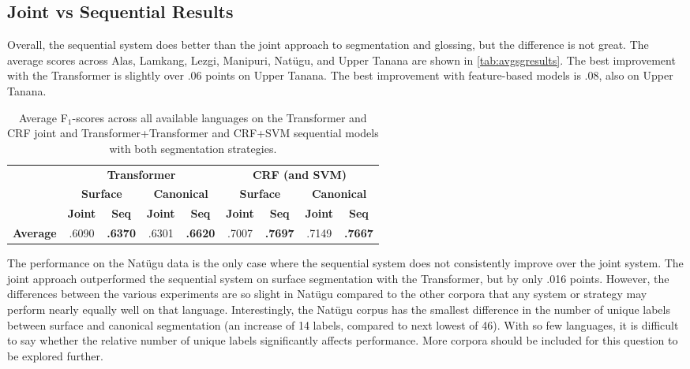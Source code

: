 \subsection{Joint vs Sequential Results}

Overall, the sequential system does better than the joint approach to segmentation and glossing, but the difference is not great. The average scores across Alas, Lamkang, Lezgi, Manipuri, Nat\"ugu, and Upper Tanana are shown in \autoref{tab:avgsgresults}. The best improvement with the Transformer is slightly over .06 points on Upper Tanana. The best improvement with feature-based models is .08, also on Upper Tanana. 

\begin{table}[!tb]
    \centering
    \begin{tabular}{l|cc|cc|cc|cc}
          & \multicolumn{4}{c|}{\textbf{Transformer}} & \multicolumn{4}{c}{\textbf{CRF (and SVM)}} 
          \\
          & \multicolumn{2}{c|}{\textbf{Surface}} & \multicolumn{2}{c|}{\textbf{Canonical}}  & \multicolumn{2}{c|}{\textbf{Surface}} & \multicolumn{2}{c}{\textbf{Canonical}} 
          \\
          &  \textbf{Joint} & \textbf{Seq} &  \textbf{Joint} & \textbf{Seq} &  \textbf{Joint} & \textbf{Seq} &  \textbf{Joint} & \textbf{Seq} \\
         \hline
         \textbf{Average} & .6090 & \textbf{.6370} & .6301 & \textbf{.6620} 
                 & .7007 & \textbf{.7697} & .7149 & \textbf{.7667} \\
    \end{tabular}
    \caption[Average Results of All Joint and Sequential models]{Average F$_1$-scores across all available languages on the Transformer and CRF joint and Transformer+Transformer and CRF+SVM sequential models with both segmentation strategies.}
    \label{tab:avgsgresults}
\end{table}

The performance on the Nat\"ugu data is the only case where the sequential system does not consistently improve over the joint system. The joint approach outperformed the sequential system on surface segmentation with the Transformer, but by only .016 points. However, the differences between the various experiments are so slight in Nat\"ugu compared to the other corpora that any system or strategy may perform nearly equally well on that language. Interestingly, the Nat\"ugu corpus has the smallest difference in the number of unique labels between surface and canonical segmentation (an increase of 14 labels, compared to next lowest of 46). With so few languages, it is difficult to say whether the relative number of unique labels significantly affects performance. More corpora should be included for this question to be explored further. 
 

